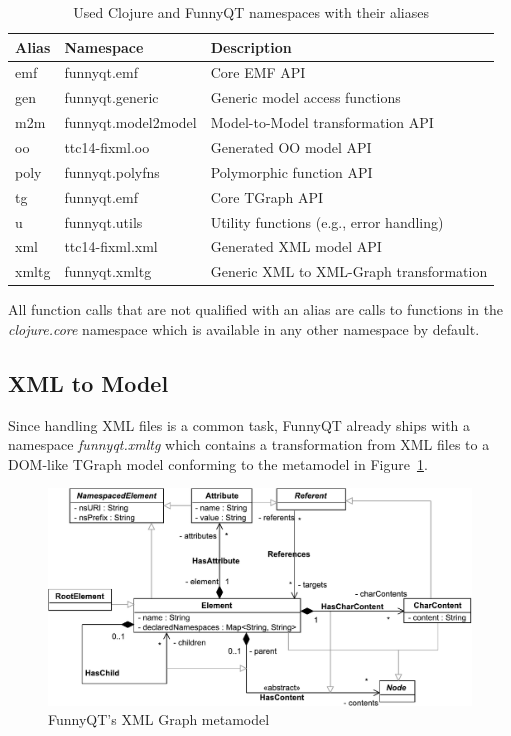 \documentclass[submission]{eptcs}
\begin{document}
\begin{table}[h!t]
  \centering
  \begin{tabular}{| l | l | l |}
    \hline
    \textbf{Alias} & \textbf{Namespace}           & \textbf{Description}\\
    \hline
    \textsf{emf}   & \textsf{funnyqt.emf}         & Core EMF API\\
    \textsf{gen}   & \textsf{funnyqt.generic}     & Generic model access functions\\
    \textsf{m2m}   & \textsf{funnyqt.model2model} & Model-to-Model transformation API\\
    \textsf{oo}    & \textsf{ttc14-fixml.oo}      & Generated OO model API\\
    \textsf{poly}  & \textsf{funnyqt.polyfns}     & Polymorphic function API\\
    \textsf{tg}    & \textsf{funnyqt.emf}         & Core TGraph API\\
    \textsf{u}     & \textsf{funnyqt.utils}       & Utility functions (e.g., error handling)\\
    \textsf{xml}   & \textsf{ttc14-fixml.xml}     & Generated XML model API\\
    \textsf{xmltg} & \textsf{funnyqt.xmltg}       & Generic XML to XML-Graph transformation\\
    \hline
  \end{tabular}
  \caption{Used Clojure and FunnyQT namespaces with their aliases}
  \label{tab:namespaces}
\end{table}

All function calls that are not qualified with an alias are calls to functions
in the \emph{clojure.core} namespace which is available in any other namespace
by default.

\subsection{XML to Model}
\label{sec:xml2model}

Since handling XML files is a common task, FunnyQT already ships with a
namespace \emph{funnyqt.xmltg} which contains a transformation from XML files
to a DOM-like TGraph model conforming to the metamodel in
Figure~\ref{fig:xml-mm}.

\begin{figure}[h!t]
  \centering
  \includegraphics[width=.8\textwidth]{xml-schema}
  \caption{FunnyQT's XML Graph metamodel}
  \label{fig:xml-mm}
\end{figure}
\end{document}

